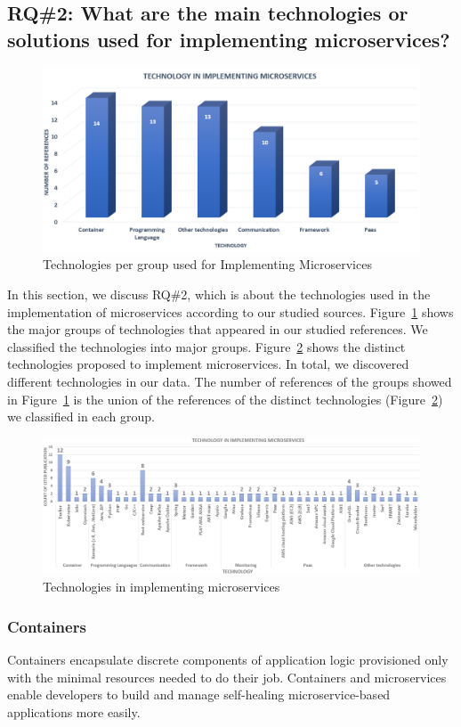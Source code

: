 \subsection{RQ\#2: What are the main technologies or solutions used for implementing microservices?}\label{sec:results-rq2}

\begin{figure}[h]
	\centering
	\includegraphics[width=0.5\linewidth]{images/commtechother.png}
	\caption{Technologies per group used for Implementing Microservices}
	\label{fig:tech-group}
\end{figure}	

In this section, we discuss RQ\#2, which is about the technologies used in the implementation of microservices according to our studied sources. Figure~\ref{fig:tech-group} shows the major groups of technologies that appeared in our studied references. We classified the technologies into \techgroupcount major groups.
Figure~\ref{fig:tech-distinct} shows the distinct technologies proposed to implement microservices. In total, we discovered \techcount different technologies in our data. 
The number of references of the groups showed in Figure~\ref{fig:tech-group} is the union of the references of the distinct technologies (Figure~\ref{fig:tech-distinct}) we classified in each group.  

\begin{figure}[t]
	\centering
	\includegraphics[width=\linewidth]{images/commontechupdated.png}
	\caption{Technologies in implementing microservices }
	\label{fig:tech-distinct}
\end{figure}


\subsubsection{Containers}
Containers encapsulate discrete components of application logic provisioned only with the minimal resources needed to do their job. Containers and microservices enable developers to build and manage self-healing microservice-based applications more easily.
 
